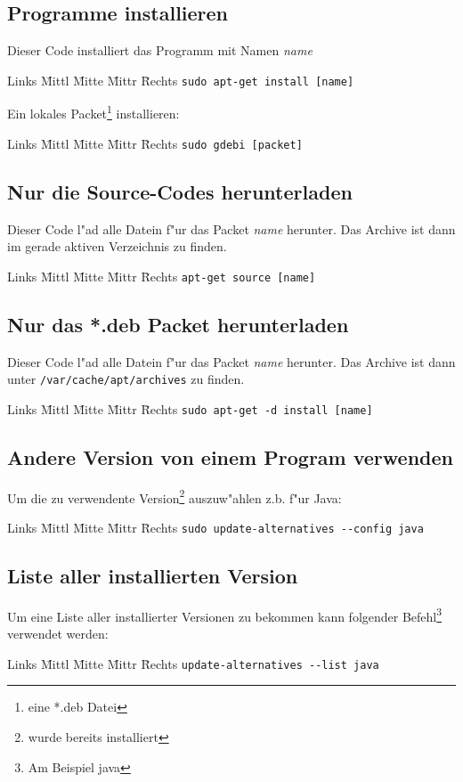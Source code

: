 \documentclass[12pt]{article}
\newenvironment{code}{\begin{tabbing}Links \= Mittl \= Mitte \= Mittr \= Rechts \kill}{\end{tabbing}}
\begin{document}
\subsection{Programme installieren}
Dieser Code installiert das Programm mit Namen \textit{name}
\begin{code}
	\> \verb#sudo apt-get install [name]#
\end{code}
Ein lokales Packet\footnote{eine *.deb Datei} installieren:
\begin{code}
	\> \verb#sudo gdebi [packet]#
\end{code}

\subsection{Nur die Source-Codes herunterladen}
Dieser Code l"ad alle Datein f"ur das Packet \textit{name} herunter. Das Archive ist dann 
im gerade aktiven Verzeichnis zu finden.
\begin{code}
	\> \verb#apt-get source [name]#
\end{code}

\subsection{Nur das *.deb Packet herunterladen}
Dieser Code l"ad alle Datein f"ur das Packet \textit{name} herunter. Das Archive ist dann unter 
\verb#/var/cache/apt/archives# zu finden.
\begin{code}
	\> \verb#sudo apt-get -d install [name]#
\end{code}
\subsection{Andere Version von einem Program verwenden}
Um die zu verwendente Version\footnote{wurde bereits installiert} auszuw"ahlen
z.b. f"ur Java:
\begin{code}
	\> \verb#sudo update-alternatives --config java#
\end{code}
\subsection{Liste aller installierten Version}
Um eine Liste aller installierter Versionen zu bekommen kann folgender Befehl\footnote{Am Beispiel java}
 verwendet werden:
\begin{code}
	\> \verb#update-alternatives --list java#
\end{code}
\end{document}
